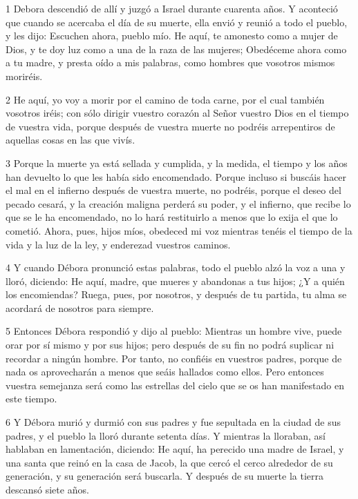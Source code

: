 \par 1 Debora descendió de allí y juzgó a Israel durante cuarenta años. Y aconteció que cuando se acercaba el día de su muerte, ella envió y reunió a todo el pueblo, y les dijo: Escuchen ahora, pueblo mío. He aquí, te amonesto como a mujer de Dios, y te doy luz como a una de la raza de las mujeres; Obedéceme ahora como a tu madre, y presta oído a mis palabras, como hombres que vosotros mismos moriréis.

\par 2 He aquí, yo voy a morir por el camino de toda carne, por el cual también vosotros iréis; con sólo dirigir vuestro corazón al Señor vuestro Dios en el tiempo de vuestra vida, porque después de vuestra muerte no podréis arrepentiros de aquellas cosas en las que vivís.

\par 3 Porque la muerte ya está sellada y cumplida, y la medida, el tiempo y los años han devuelto lo que les había sido encomendado. Porque incluso si buscáis hacer el mal en el infierno después de vuestra muerte, no podréis, porque el deseo del pecado cesará, y la creación maligna perderá su poder, y el infierno, que recibe lo que se le ha encomendado, no lo hará restituirlo a menos que lo exija el que lo cometió. Ahora, pues, hijos míos, obedeced mi voz mientras tenéis el tiempo de la vida y la luz de la ley, y enderezad vuestros caminos.

\par 4 Y cuando Débora pronunció estas palabras, todo el pueblo alzó la voz a una y lloró, diciendo: He aquí, madre, que mueres y abandonas a tus hijos; ¿Y a quién los encomiendas? Ruega, pues, por nosotros, y después de tu partida, tu alma se acordará de nosotros para siempre.

\par 5 Entonces Débora respondió y dijo al pueblo: Mientras un hombre vive, puede orar por sí mismo y por sus hijos; pero después de su fin no podrá suplicar ni recordar a ningún hombre. Por tanto, no confiéis en vuestros padres, porque de nada os aprovecharán a menos que seáis hallados como ellos. Pero entonces vuestra semejanza será como las estrellas del cielo que se os han manifestado en este tiempo.

\par 6 Y Débora murió y durmió con sus padres y fue sepultada en la ciudad de sus padres, y el pueblo la lloró durante setenta días. Y mientras la lloraban, así hablaban en lamentación, diciendo: He aquí, ha perecido una madre de Israel, y una santa que reinó en la casa de Jacob, la que cercó el cerco alrededor de su generación, y su generación será buscarla. Y después de su muerte la tierra descansó siete años.

